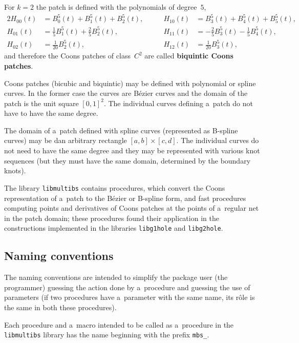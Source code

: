 For $k=2$ the patch is defined with the polynomials of degree~$5$,
\begin{alignat*}{2}
  H_{00}(t) &{}= B^5_0(t)+B^5_1(t)+B^5_2(t),\qquad &
  H_{10}(t) &{}= B^5_3(t)+B^5_4(t)+B^5_5(t), \\
  H_{01}(t) &{}= \frac{1}{5}B^5_1(t)+\frac{2}{5}B^5_2(t), \qquad &
  H_{11}(t) &{}= -\frac{2}{5}B^5_3(t)-\frac{1}{5}B^5_4(t), \\
  H_{02}(t) &{}= \frac{1}{20}B^5_2(t), \qquad &
  H_{12}(t) &{}= \frac{1}{20}B^5_3(t),
\end{alignat*}
and therefore the Coons patches of class~$C^2$ are called \textbf{biquintic
Coons patches}.

Coons patches (bicubic and biquintic) may be defined with polynomial or
spline curves. In the former case the curves are B\'{e}zier curves and the
domain of the patch is the unit square $[0,1]^2$. The individual curves
defining a~patch do not have to have the same degree.

The domain of a~patch defined with spline curves (represented as B-spline
curves) may be dan arbitrary rectangle $[a,b]\times[c,d]$. The individual
curves do not need to have the same degree and they may be represented
with various knot sequences (but they must have the same domain,
determined by the boundary knots).

The library \texttt{libmultibs} contains procedures, which convert the
Coons representation of a~patch to the B\'{e}zier or B-spline form,
and fast procedures computing points and derivatives of Coons patches
at the points of a~regular net in the patch domain; these procedures
found their application in the constructions implemented in
the libraries \texttt{libg1hole} and \texttt{libg2hole}.



\subsection{Naming conventions}

The naming conventions are intended to simplify the package user (the
programmer) guessing the action done by a~procedure and guessing the use
of parameters (if two procedures have a~parameter with the same name,
its r\^{o}le is the same in both these procedures).

\begin{sloppypar}
Each procedure and a~macro intended to be called as a~procedure in the
\texttt{libmultibs} library has the name beginning with the prefix
\texttt{mbs\_}.
\end{sloppypar}

